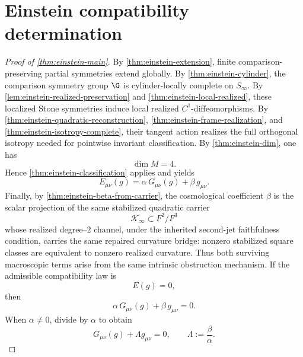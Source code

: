 \section{Einstein compatibility determination}
\label{sec:einstein-proof}
\begin{proof}[Proof of \cref{thm:einstein-main}]
	By \cref{thm:einstein-extension}, finite comparison-preserving partial
	symmetries extend globally.
	By \cref{thm:einstein-cylinder}, the comparison symmetry group \(\G\) is
	cylinder-locally complete on \(S_\infty\).
	By \cref{lem:einstein-realized-preservation} and
	\cref{thm:einstein-local-realized}, these localized Stone symmetries
	induce local realized \(C^1\)-diffeomorphisms.
	By \cref{thm:einstein-quadratic-reconstruction},
	\cref{thm:einstein-frame-realization}, and
	\cref{thm:einstein-isotropy-complete}, their tangent action realizes
	the full orthogonal isotropy needed for pointwise invariant
	classification.
	By \cref{thm:einstein-dim}, one has
	\[
		\dim M=4.
	\]
	Hence \cref{thm:einstein-classification} applies and yields
	\[
		E_{\mu\nu}(g)=\alpha\,G_{\mu\nu}(g)+\beta\,g_{\mu\nu}.
	\]
	Finally, by \cref{thm:einstein-beta-from-carrier}, the cosmological
	coefficient \(\beta\) is the scalar projection of the same stabilized
	quadratic carrier
	\[
		\mathcal K_\infty\subset F^2/F^3
	\]
	whose realized degree--\(2\) channel, under the inherited second-jet faithfulness condition, carries the same repaired curvature bridge:
	nonzero stabilized square classes are equivalent to nonzero realized
	curvature.
	Thus both surviving macroscopic terms arise from the same intrinsic
	obstruction mechanism.
	If the admissible compatibility law is
	\[
		E(g)=0,
	\]
	then
	\[
		\alpha\,G_{\mu\nu}(g)+\beta\,g_{\mu\nu}=0.
	\]
	When \(\alpha\neq 0\), divide by \(\alpha\) to obtain
	\[
		G_{\mu\nu}(g)+\Lambda g_{\mu\nu}=0,
		\qquad
		\Lambda:=\frac{\beta}{\alpha}.
	\]
\end{proof}
